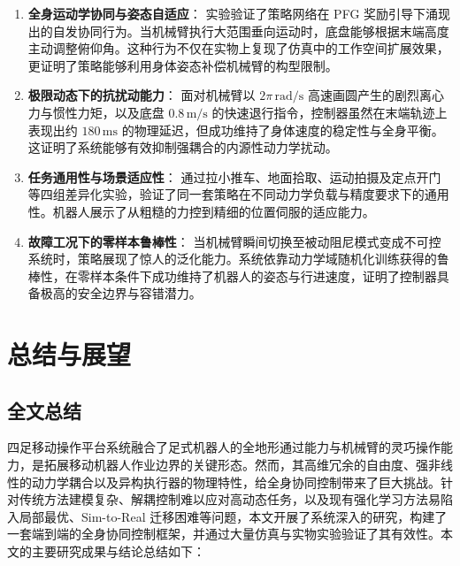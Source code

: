 \begin{enumerate}
    \item \textbf{全身运动学协同与姿态自适应}：
          实验验证了策略网络在 PFG 奖励引导下涌现出的自发协同行为。当机械臂执行大范围垂向运动时，底盘能够根据末端高度主动调整俯仰角。这种行为不仅在实物上复现了仿真中的工作空间扩展效果，更证明了策略能够利用身体姿态补偿机械臂的构型限制。
    \item \textbf{极限动态下的抗扰动能力}：
          面对机械臂以 $2\pi\,\text{rad/s}$ 高速画圆产生的剧烈离心力与惯性力矩，以及底盘 $0.8\,\text{m/s}$ 的快速退行指令，控制器虽然在末端轨迹上表现出约 $180\,\text{ms}$ 的物理延迟，但成功维持了身体速度的稳定性与全身平衡。这证明了系统能够有效抑制强耦合的内源性动力学扰动。

    \item \textbf{任务通用性与场景适应性}：
          通过拉小推车、地面拾取、运动拍摄及定点开门等四组差异化实验，验证了同一套策略在不同动力学负载与精度要求下的通用性。机器人展示了从粗糙的力控到精细的位置伺服的适应能力。

    \item \textbf{故障工况下的零样本鲁棒性}：
          当机械臂瞬间切换至被动阻尼模式变成不可控系统时，策略展现了惊人的泛化能力。系统依靠动力学域随机化训练获得的鲁棒性，在零样本条件下成功维持了机器人的姿态与行进速度，证明了控制器具备极高的安全边界与容错潜力。
\end{enumerate}

\chapter{总结与展望}
\label{chap:conclusion}
\section{全文总结}

四足移动操作平台系统融合了足式机器人的全地形通过能力与机械臂的灵巧操作能力，是拓展移动机器人作业边界的关键形态。然而，其高维冗余的自由度、强非线性的动力学耦合以及异构执行器的物理特性，给全身协同控制带来了巨大挑战。针对传统方法建模复杂、解耦控制难以应对高动态任务，以及现有强化学习方法易陷入局部最优、Sim-to-Real 迁移困难等问题，本文开展了系统深入的研究，构建了一套端到端的全身协同控制框架，并通过大量仿真与实物实验验证了其有效性。本文的主要研究成果与结论总结如下：

